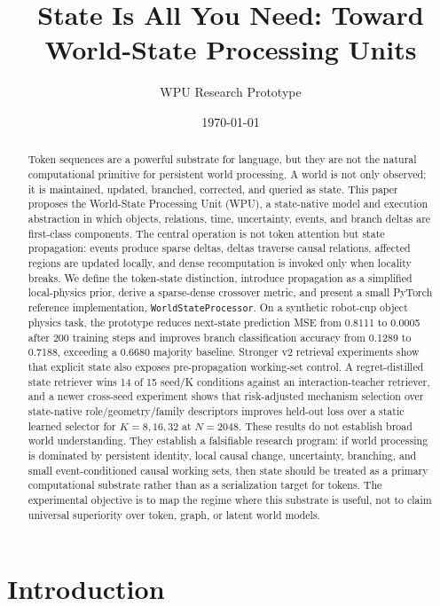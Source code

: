 \documentclass[11pt]{article}
\title{State Is All You Need: Toward World-State Processing Units}
\author{WPU Research Prototype}
\date{\today}
\begin{document}
\maketitle

\begin{abstract}
Token sequences are a powerful substrate for language, but they are not the
natural computational primitive for persistent world processing. A world is not
only observed; it is maintained, updated, branched, corrected, and queried as
state. This paper proposes the World-State Processing Unit (WPU), a
state-native model and execution abstraction in which objects, relations, time,
uncertainty, events, and branch deltas are first-class components. The central
operation is not token attention but state propagation: events produce sparse
deltas, deltas traverse causal relations, affected regions are updated locally,
and dense recomputation is invoked only when locality breaks. We define the
token-state distinction, introduce propagation as a simplified local-physics
prior, derive a sparse-dense crossover metric, and present a small PyTorch
reference implementation, \texttt{WorldStateProcessor}. On a synthetic
robot-cup object physics task, the prototype reduces next-state prediction MSE
from 0.8111 to 0.0005 after 200 training steps and improves branch
classification accuracy from 0.1289 to 0.7188, exceeding a 0.6680 majority
baseline. Stronger v2 retrieval experiments show that explicit state also
exposes pre-propagation working-set control. A regret-distilled state retriever
wins 14 of 15 seed/K conditions against an interaction-teacher retriever, and a
newer cross-seed experiment shows that risk-adjusted mechanism selection over
state-native role/geometry/family descriptors improves held-out loss over a
static learned selector for \(K=8,16,32\) at \(N=2048\). These results do not
establish broad world understanding. They establish a falsifiable research
program: if world
processing is dominated by persistent identity, local causal change,
uncertainty, branching, and small event-conditioned causal working sets, then
state should be treated as a primary computational substrate rather than as a
serialization target for tokens. The experimental objective is to map the
regime where this substrate is useful, not to claim universal superiority over
token, graph, or latent world models.
\end{abstract}

\section{Introduction}
\end{document}
